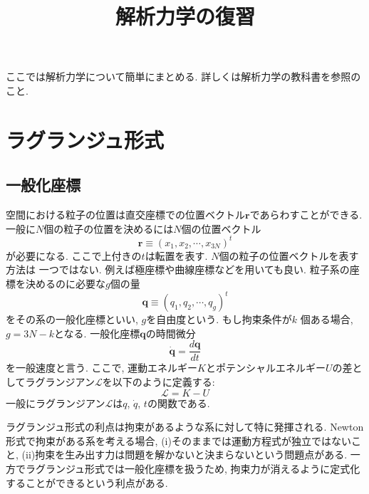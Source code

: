 





\title{解析力学の復習}
\maketitle

ここでは解析力学について簡単にまとめる.
詳しくは解析力学の教科書を参照のこと\cite{Goldstein1, Goldstein2, 1986LandauLifshitz, 1959Yamauchi, 2014Hata, 1998Yamamoto1, 1998Yamamoto2, 2010Tuckerman, 2010Hoover}.

\section{ラグランジュ形式}
\subsection{一般化座標}
空間における粒子の位置は直交座標での位置ベクトル$\bm{r}$であらわすことができる.
一般に$N$個の粒子の位置を決めるには$N$個の位置ベクトル
\begin{equation}
 \bm{r} \equiv (x_{1}, x_{2}, \cdots, x_{3N})^{t}
\end{equation}
が必要になる. ここで上付きの$t$は転置を表す. $N$個の粒子の位置ベクトルを表す方法は
一つではない. 例えば極座標や曲線座標などを用いても良い.
粒子系の座標を決めるのに必要な$g$個の量
\begin{equation}
 \bm{q} \equiv (q_{1}, q_{2}, \cdots, q_{g})^{t}
\end{equation}
をその系の一般化座標といい, $g$を自由度という.
もし拘束条件が$k$ 個ある場合, $g = 3N - k$となる.
一般化座標$\bm{q}$の時間微分
\begin{equation}
 \dot{\bm{q}} = \frac{d \bm{q}}{d t}
\end{equation}
を一般速度と言う.
ここで, 運動エネルギー$K$とポテンシャルエネルギー$U$の差としてラグランジアン$\mathcal{L}$を以下のように定義する:
\begin{equation}
 \mathcal{L} = K - U
\end{equation}
一般にラグランジアン$\mathcal{L}$は$q$, $\dot{q}$, $t$の関数である.

ラグランジュ形式の利点は拘束があるような系に対して特に発揮される.
Newton形式で拘束がある系を考える場合, (i)そのままでは運動方程式が独立ではないこと,
(ii)拘束を生み出す力は問題を解かないと決まらないという問題点がある.
一方でラグランジュ形式では一般化座標を扱うため,
拘束力が消えるように定式化することができるという利点がある.

